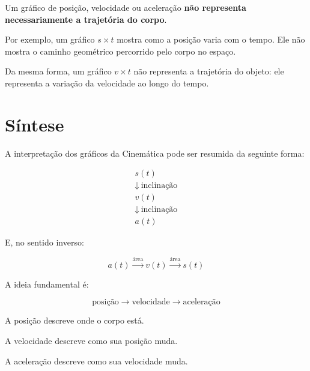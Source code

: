 \documentclass[a4paper,12pt]{article}
\newcommand{\printingbibliography}{%
    \pagestyle{myheadings}
    \markright{}
    \sloppy
    \printbibliography[
        heading=bibintoc,
        title=Referências
    ]
    \fussy
}
\begin{document}
\begin{atencao}

Um gráfico de posição, velocidade ou aceleração \textbf{não representa
necessariamente a trajetória do corpo}.

Por exemplo, um gráfico $s\times t$ mostra como a posição varia com o tempo.
Ele não mostra o caminho geométrico percorrido pelo corpo no espaço.

Da mesma forma, um gráfico $v\times t$ não representa a trajetória do objeto:
ele representa a variação da velocidade ao longo do tempo.

\end{atencao}


\section{Síntese}

A interpretação dos gráficos da Cinemática pode ser resumida da seguinte
forma:

\[
\boxed{
\begin{array}{c}
s(t) \\
\downarrow\ \text{inclinação}\\
v(t) \\
\downarrow\ \text{inclinação}\\
a(t)
\end{array}
}
\]

E, no sentido inverso:

\[
\boxed{
a(t)
\xrightarrow{\text{área}}
v(t)
\xrightarrow{\text{área}}
s(t)
}
\]

\begin{ideia}

A ideia fundamental é:

\[
\boxed{
\text{posição}
\rightarrow
\text{velocidade}
\rightarrow
\text{aceleração}
}
\]

A posição descreve onde o corpo está.

A velocidade descreve como sua posição muda.

A aceleração descreve como sua velocidade muda.

\end{ideia}


\printingbibliography
\end{document}
